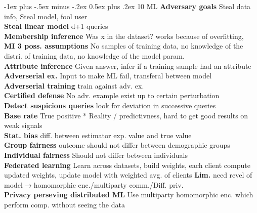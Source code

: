 \documentclass[10pt,landscape]{article}
\makeatletter
\renewcommand{\section}{\@startsection{section}{1}{0mm}%
                                {-1ex plus -.5ex minus -.2ex}%
                                {0.5ex plus .2ex}%
                                {\normalfont\large\bfseries}}
\makeatother
\begin{document}
\begin{multicols*}{4}
\section{10 ML}
\textbf{Adversary goals} Steal data info, Steal model, fool user\\
\textbf{Steal linear model} d+1 queries\\
\textbf{Membership inference} Was x in the dataset? works because of overfitting,\\
\textbf{MI 3 poss. assumptions} No samples of training data, no knowledge of the distri. of training data, no knowledge of the model param.\\
\textbf{Attribute inference} Given answer, infer if a training sample had an attribute\\
\textbf{Adverserial ex.} Input to make ML fail, transferal between model\\
\textbf{Adverserial training} train against adv. ex.\\
\textbf{Certified defense} No adv. example exist up to certain perturbation\\
\textbf{Detect suspicious queries} look for deviation in successive queries\\
\textbf{Base rate} True positive * Reality / predictivness, hard to get good results on weak signals\\
\textbf{Stat. bias} diff. between estimator exp. value and true value\\
\textbf{Group fairness} outcome should not differ between demographic groups\\
\textbf{Individual fairness} Should not differ between individuals\\
\textbf{Federated learning} Learn across datasets, build weights, each client compute updated weights, update model with weighted avg. of clients
\textbf{Lim.} need revel of model$\rightarrow$homomorphic enc./multiparty comm./Diff. priv.\\
\textbf{Privacy perseving distributed ML} Use multiparty homomorphic enc. which perform comp. without seeing the data\\


\end{multicols*}
\end{document}
